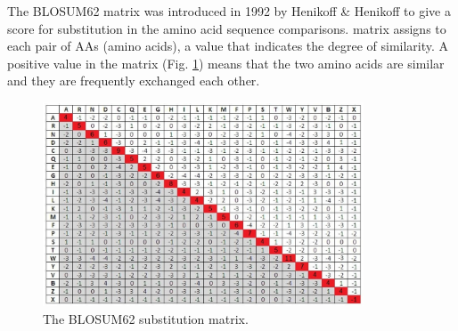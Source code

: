  The BLOSUM62 matrix was introduced in 1992 by Henikoff \& Henikoff \cite{sw-blosum} to give a score for substitution in the amino acid sequence comparisons.
  matrix assigns to each pair of AAs (amino acids), a value that indicates the degree of similarity.
 A positive value in the matrix (Fig. \ref{blosum62}) means that the two amino acids are similar and they are frequently exchanged each other. 
\begin{figure}[h!]
     	\centering
     	\includegraphics[width=0.85\textwidth]{imm/sw/blosum62.png} 	\caption{The BLOSUM62 substitution matrix.} 
     	\label{blosum62}
\end{figure}
\clearpage
